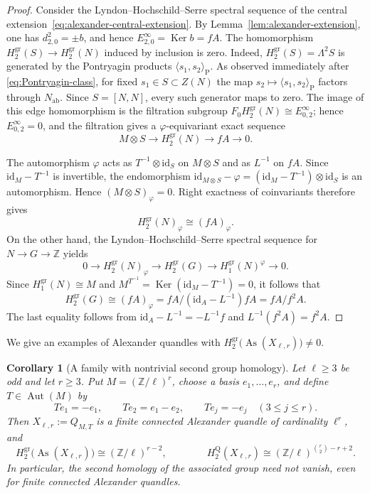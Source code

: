 \documentclass[11pt]{article}
\newtheorem{corollary}[theorem]{Corollary}
\DeclareMathOperator{\As}{As}
\DeclareMathOperator{\Ker}{Ker}
\newcommand{\ZZ}{\mathbb Z}
\newcommand{\gr}{\mathrm{gr}}
\newcommand{\Q}{\mathrm Q}
\newcommand{\ab}{\mathrm{ab}}
\begin{document}
\begin{proof}
Consider the Lyndon--Hochschild--Serre spectral sequence of the central
extension~\eqref{eq:alexander-central-extension}. By
Lemma~\ref{lem:alexander-extension}, one has $d^2_{2,0}=\pm b$, and hence
$E^\infty_{2,0}=\Ker b=fA$. The homomorphism
$H_2^{\gr}(S)\to H_2^{\gr}(N)$ induced by inclusion is zero. Indeed,
$H_2^{\gr}(S)=\Lambda^2S$ is generated by the Pontryagin products
$\langle s_1,s_2\rangle_{\mathrm P}$. As observed immediately after
\eqref{eq:Pontryagin-class}, for fixed $s_1\in S\subset Z(N)$ the map
$s_2\mapsto\langle s_1,s_2\rangle_{\mathrm P}$ factors through $N_{\ab}$.
Since $S=[N,N]$, every such generator maps to zero. The image of this edge
homomorphism is the filtration subgroup
$F_0H_2^{\gr}(N)\cong E^\infty_{0,2}$; hence $E^\infty_{0,2}=0$, and the
filtration gives a
$\varphi$-equivariant exact sequence
\[
 M\otimes S\longrightarrow H_2^{\gr}(N)
 \longrightarrow fA\longrightarrow0.
\]

The automorphism $\varphi$ acts as $T^{-1}\otimes\mathrm{id}_S$ on
$M\otimes S$ and as $L^{-1}$ on $fA$. Since
$\mathrm{id}_M-T^{-1}$ is invertible, the endomorphism
$\mathrm{id}_{M\otimes S}-\varphi=(\mathrm{id}_M-T^{-1})\otimes\mathrm{id}_S$
is an automorphism. Hence $(M\otimes S)_\varphi=0$. Right exactness of
coinvariants therefore gives
\[
 H_2^{\gr}(N)_\varphi\cong(fA)_\varphi.
\]
On the other hand, the Lyndon--Hochschild--Serre spectral sequence for
$N\to G\to\ZZ$ yields
\[
 0\longrightarrow H_2^{\gr}(N)_\varphi
 \longrightarrow H_2^{\gr}(G)
 \longrightarrow H_1^{\gr}(N)^\varphi
 \longrightarrow0.
\]
Since $H_1^{\gr}(N)\cong M$ and
$M^{T^{-1}}=\Ker(\mathrm{id}_M-T^{-1})=0$, it follows that
\[
 H_2^{\gr}(G)\cong(fA)_\varphi
 =fA/(\mathrm{id}_A-L^{-1})fA=fA/f^2A.
\]
The last equality follows from
$\mathrm{id}_A-L^{-1}=-L^{-1}f$ and
$L^{-1}(f^2A)=f^2A$.
\end{proof}
We give an examples of Alexander quandles with $  H_2^{\gr}\bigl(\As(X_{\ell,r})\bigr) \neq 0. $
\begin{corollary}[A family with nontrivial second group homology]
\label{cor:alexander-nonvanishing-family}
Let $\ell\ge3$ be odd and let $r\ge3$. Put
$M=(\ZZ/\ell)^r$, choose a basis $e_1,\ldots,e_r$, and define
$T\in\operatorname{Aut}(M)$ by
\[
 Te_1=-e_1,\qquad
 Te_2=e_1-e_2,\qquad
 Te_j=-e_j\quad(3\le j\le r).
\]
Then $X_{\ell,r}:=Q_{M,T}$ is a finite connected Alexander quandle of
cardinality $\ell^r$, and
\[
 H_2^{\gr}\bigl(\As(X_{\ell,r})\bigr)
 \cong(\ZZ/\ell)^{r-2}, \qquad \qquad 
 H_2^\Q(X_{\ell,r})
 \cong(\ZZ/\ell)^{\binom r2-r+2}.
\]
In particular, the second homology of the associated group need not vanish,
even for finite connected Alexander quandles.
\end{corollary}
\end{document}
